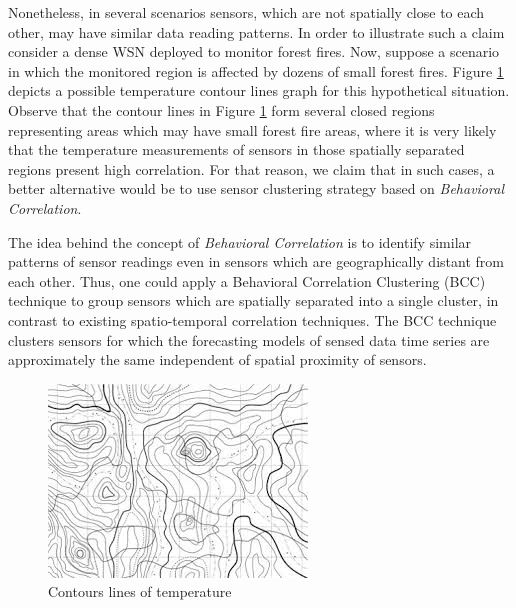 \documentclass[conference]{IEEEtran}
\begin{document}
Nonetheless, in several scenarios sensors, which are not spatially close to each
other, may have similar data reading patterns. In order to illustrate such a
claim consider a dense WSN deployed to monitor forest fires. 
Now, suppose a scenario in which the monitored region is affected by dozens of
small forest fires. Figure \ref{fig:contour_lines} depicts a possible temperature
contour lines graph for this hypothetical situation. Observe that the contour
lines in Figure \ref{fig:contour_lines} form several closed regions representing
areas which may have small forest fire areas, where it is very likely that the
temperature measurements of sensors in those spatially separated regions present
high correlation. For that reason, we claim that in such cases, a better
alternative would be to use sensor clustering strategy based on
\textit{Behavioral Correlation}.

The idea behind the concept of {\it Behavioral Correlation} is to identify
similar patterns of sensor readings even in sensors which are geographically
distant from each other. Thus, one could apply a Behavioral Correlation
Clustering (BCC) technique to group sensors which are spatially separated into a
single cluster, in contrast to existing spatio-temporal correlation techniques.
The BCC technique clusters sensors for which the forecasting models of sensed
data time series are approximately the same independent of spatial proximity of
sensors.




\begin{figure}[!htb]
\centering
	\includegraphics[scale=0.7]{I2.png}
    \caption{Contours lines of temperature}
    \label{fig:contour_lines}
\end{figure}
\end{document}

